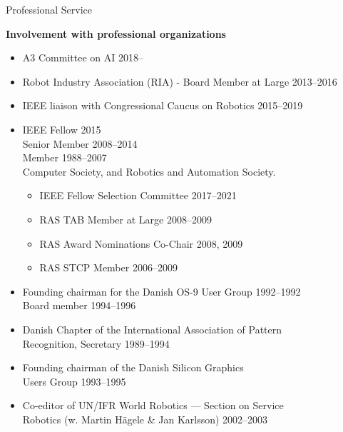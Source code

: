 \documentclass{article}
\begin{document}
\begin{cv}
\begin{cvlist}{Professional Service}
\item {\bf Involvement with professional organizations}
  \begin{itemize}
  \item A3 Committee on AI \cftdotfill{\cftdotsep} 2018--
  \item Robot Industry Association (RIA) - Board Member at Large
    \cftdotfill{\cftdotsep} 2013--2016
  \item IEEE liaison with Congressional Caucus on Robotics
    \cftdotfill{\cftdotsep}  2015--2019
  \item IEEE Fellow \cftdotfill{\cftdotsep} 2015\\
    Senior Member   \cftdotfill{\cftdotsep} 2008--2014\\
    Member \cftdotfill{\cftdotsep}    1988--2007\\
    Computer Society, and Robotics and Automation Society.
    \begin{itemize}
    \item IEEE Fellow Selection Committee \cftdotfill{\cftdotsep} 2017--2021
    \item RAS TAB Member at Large \cftdotfill{\cftdotsep} 2008--2009
    \item RAS Award Nominations Co-Chair \cftdotfill{\cftdotsep} 2008,
      2009
    \item RAS STCP Member \cftdotfill{\cftdotsep} 2006--2009
    \end{itemize}
  \item Founding chairman for the Danish OS-9 User Group
    \cftdotfill{\cftdotsep} 1992--1992\\ Board member
    \cftdotfill{\cftdotsep} 1994--1996
  \item Danish Chapter of the International Association of
    Pattern\\ Recognition, Secretary \cftdotfill{\cftdotsep}
    1989--1994
  \item Founding chairman of the Danish Silicon Graphics \\Users Group
    \cftdotfill{\cftdotsep} 1993--1995
  \item Co-editor of UN/IFR World Robotics --- Section on
    Service\\ Robotics (w. Martin H\"agele \& Jan Karlsson)
    \cftdotfill{\cftdotsep} 2002--2003
  \end{itemize}


\end{cvlist}
\end{cv}
\end{document}
